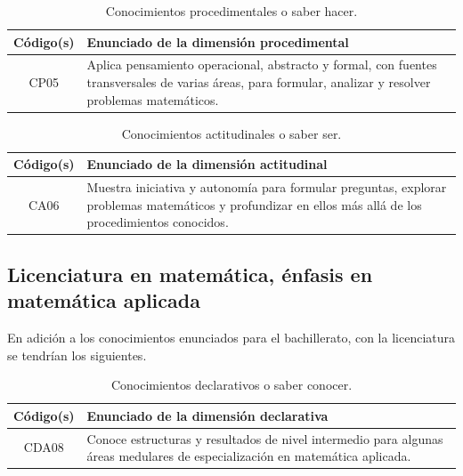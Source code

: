 \documentclass[11pt,a4paper]{article}
\begin{document}

\begin{table}[H]
\centering
\renewcommand{\arraystretch}{1.3}
\begin{tabular}{|c|p{9cm}|}
\hline
\cellcolor[HTML]{00C0F3}\textbf{Código(s)}  & \cellcolor[HTML]{00C0F3}\textbf{Enunciado de la dimensión procedimental} \\
\hline
CP05 & Aplica pensamiento operacional, abstracto y formal, con fuentes transversales de varias áreas, para formular, analizar y resolver problemas matemáticos. \\
\hline
\end{tabular}
\caption{Conocimientos procedimentales o saber hacer.}
\end{table}


\begin{table}[H]
\centering
\renewcommand{\arraystretch}{1.3}
\begin{tabular}{|c|p{9cm}|}
\hline
\cellcolor[HTML]{00C0F3}\textbf{Código(s)} & \cellcolor[HTML]{00C0F3}\textbf{Enunciado de la dimensión actitudinal} \\
\hline
CA06 & Muestra iniciativa y autonomía para formular preguntas, explorar problemas matemáticos y profundizar en ellos más allá de los procedimientos conocidos.\\
\hline
\end{tabular}
\caption{Conocimientos actitudinales o saber ser.}
\end{table}

\subsection*{Licenciatura en matemática, énfasis en matemática aplicada}

En adición a los conocimientos enunciados para el bachillerato, con la licenciatura se tendrían los siguientes.

\begin{table}[H]
\centering
\renewcommand{\arraystretch}{1.3}
\begin{tabular}{|c|p{9cm}|}
\hline
\cellcolor[HTML]{00C0F3}\textbf{Código(s)} & \cellcolor[HTML]{00C0F3}\textbf{Enunciado de la dimensión declarativa} \\
\hline
CDA08 & Conoce estructuras y resultados de nivel intermedio para algunas áreas medulares de especialización en matemática aplicada. 
\\
\hline
\end{tabular}
\caption{Conocimientos declarativos o saber conocer.}
\end{table}
\end{document}
